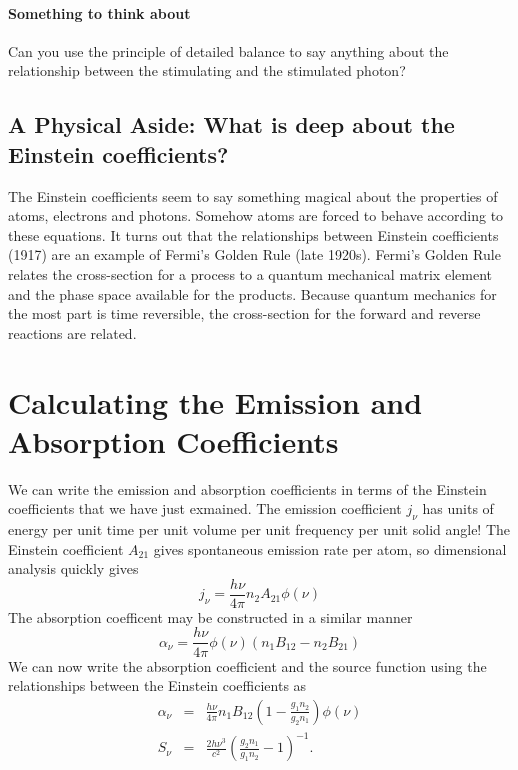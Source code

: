 \paragraph{Something to think about}  Can you use the principle of
detailed balance to say anything about the relationship between the
stimulating and the stimulated photon?

\subsection[A Physical Aside: Einstein coefficients]{A Physical Aside: What is deep about the Einstein coefficients?}
\label{sec:physical-aside:-what-1}

The Einstein coefficients seem to say something magical about the properties
of atoms, electrons and photons.   Somehow atoms are forced to behave
according to these equations.  It turns out that the relationships between 
Einstein coefficients (1917) are an example of Fermi's Golden Rule
(late 1920s).  Fermi's Golden Rule relates the cross-section for a
process to a quantum mechanical matrix element and the phase space
available for the products.  Because quantum mechanics for the most
part is time reversible, the cross-section for the forward and reverse
reactions are related.

\section{Calculating the Emission and Absorption Coefficients}
\label{sec:calc-emiss-absoprt}

We can write the emission and absorption coefficients in terms of the
Einstein coefficients that we have just exmained.  The emission
coefficient $j_\nu$ has units of energy per unit time per unit volume
per unit frequency per unit solid angle!  The Einstein coefficient
$A_{21}$ gives spontaneous emission rate per atom, so dimensional analysis
quickly gives
\begin{equation}
j_\nu = \frac{h \nu}{4\pi} n_2 A_{21} \phi(\nu)
\label{eq:75}
\end{equation}
The absorption coefficent may be constructed in a similar manner
\begin{equation}
\alpha_\nu = \frac{h \nu}{4\pi} \phi(\nu) \left (n_1 B_{12} - n_2 B_{21} 
\right )
\label{eq:76}
\end{equation}
We can now write the absorption coefficient and the source function using the 
relationships between the Einstein coefficients as 
\begin{eqnarray}
\label{eq:77}
\alpha_\nu &=& \frac{h\nu}{4\pi} n_1 B_{12} \left ( 1 - \frac{g_1
n_2}{g_2 n_1}\right ) \phi(\nu) 
\label{eq:839}\\ 
S_\nu &=& \frac{2h\nu^3}{c^2} \left (
\frac{g_2 n_1}{g_1 n_2} - 1 \right )^{-1}.
\label{eq:78}
\end{eqnarray}

